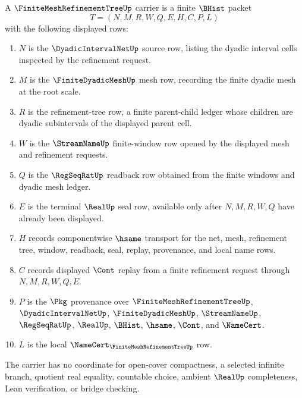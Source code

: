 \begin{definition}
\label{def:finite-mesh-refinement-tree-carrier}
A $\FiniteMeshRefinementTreeUp$ carrier is a finite $\BHist$ packet
$$
T=(N,M,R,W,Q,E,H,C,P,L)
$$
with the following displayed rows:
\begin{enumerate}
\item $N$ is the $\DyadicIntervalNetUp$ source row, listing the dyadic interval cells inspected by the refinement request.
\item $M$ is the $\FiniteDyadicMeshUp$ mesh row, recording the finite dyadic mesh at the root scale.
\item $R$ is the refinement-tree row, a finite parent-child ledger whose children are dyadic subintervals of the displayed parent cell.
\item $W$ is the $\StreamNameUp$ finite-window row opened by the displayed mesh and refinement requests.
\item $Q$ is the $\RegSeqRatUp$ readback row obtained from the finite windows and dyadic mesh ledger.
\item $E$ is the terminal $\RealUp$ seal row, available only after $N,M,R,W,Q$ have already been displayed.
\item $H$ records componentwise $\hsame$ transport for the net, mesh, refinement tree, window, readback, seal, replay, provenance, and local name rows.
\item $C$ records displayed $\Cont$ replay from a finite refinement request through $N,M,R,W,Q,E$.
\item $P$ is the $\Pkg$ provenance over $\FiniteMeshRefinementTreeUp$, $\DyadicIntervalNetUp$, $\FiniteDyadicMeshUp$, $\StreamNameUp$, $\RegSeqRatUp$, $\RealUp$, $\BHist$, $\hsame$, $\Cont$, and $\NameCert$.
\item $L$ is the local $\NameCert_{\FiniteMeshRefinementTreeUp}$ row.
\end{enumerate}
The carrier has no coordinate for open-cover compactness, a selected infinite branch, quotient real equality, countable choice, ambient $\RealUp$ completeness, Lean verification, or bridge checking.
\end{definition}

